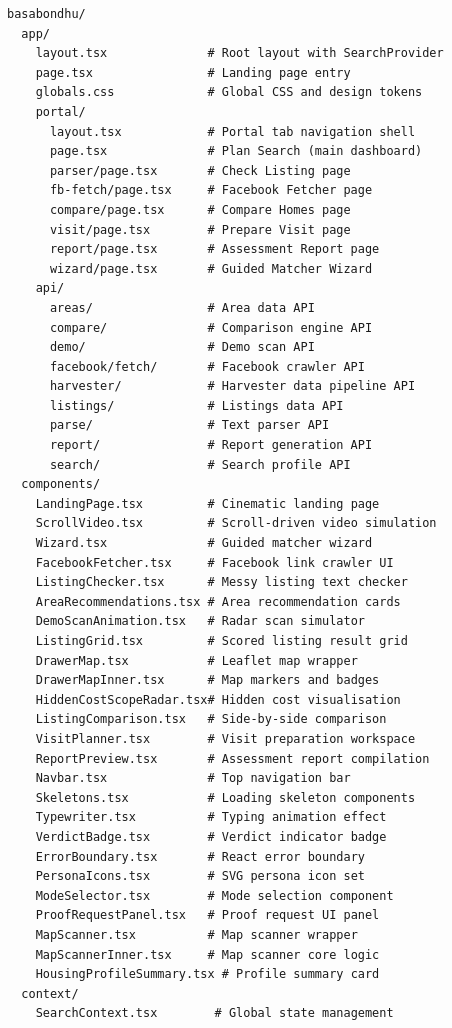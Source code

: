 \documentclass[12pt, a4paper, oneside]{report}
\begin{document}
\begin{lstlisting}[language={}, caption={Project Directory Tree}]
basabondhu/
  app/
    layout.tsx              # Root layout with SearchProvider
    page.tsx                # Landing page entry
    globals.css             # Global CSS and design tokens
    portal/
      layout.tsx            # Portal tab navigation shell
      page.tsx              # Plan Search (main dashboard)
      parser/page.tsx       # Check Listing page
      fb-fetch/page.tsx     # Facebook Fetcher page
      compare/page.tsx      # Compare Homes page
      visit/page.tsx        # Prepare Visit page
      report/page.tsx       # Assessment Report page
      wizard/page.tsx       # Guided Matcher Wizard
    api/
      areas/                # Area data API
      compare/              # Comparison engine API
      demo/                 # Demo scan API
      facebook/fetch/       # Facebook crawler API
      harvester/            # Harvester data pipeline API
      listings/             # Listings data API
      parse/                # Text parser API
      report/               # Report generation API
      search/               # Search profile API
  components/
    LandingPage.tsx         # Cinematic landing page
    ScrollVideo.tsx         # Scroll-driven video simulation
    Wizard.tsx              # Guided matcher wizard
    FacebookFetcher.tsx     # Facebook link crawler UI
    ListingChecker.tsx      # Messy listing text checker
    AreaRecommendations.tsx # Area recommendation cards
    DemoScanAnimation.tsx   # Radar scan simulator
    ListingGrid.tsx         # Scored listing result grid
    DrawerMap.tsx           # Leaflet map wrapper
    DrawerMapInner.tsx      # Map markers and badges
    HiddenCostScopeRadar.tsx# Hidden cost visualisation
    ListingComparison.tsx   # Side-by-side comparison
    VisitPlanner.tsx        # Visit preparation workspace
    ReportPreview.tsx       # Assessment report compilation
    Navbar.tsx              # Top navigation bar
    Skeletons.tsx           # Loading skeleton components
    Typewriter.tsx          # Typing animation effect
    VerdictBadge.tsx        # Verdict indicator badge
    ErrorBoundary.tsx       # React error boundary
    PersonaIcons.tsx        # SVG persona icon set
    ModeSelector.tsx        # Mode selection component
    ProofRequestPanel.tsx   # Proof request UI panel
    MapScanner.tsx          # Map scanner wrapper
    MapScannerInner.tsx     # Map scanner core logic
    HousingProfileSummary.tsx # Profile summary card
  context/
    SearchContext.tsx        # Global state management

\end{lstlisting}
\end{document}
